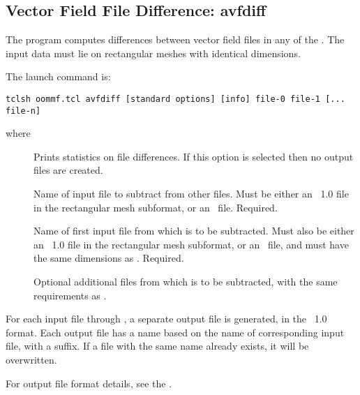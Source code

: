 
\subsection{Vector Field File Difference:
          avfdiff}\label{sec:avfdiff}%
%
The  program computes differences between vector field files
in any of the .  The input data must lie on rectangular meshes with
identical dimensions.

The  launch command is:
\begin{verbatim}
tclsh oommf.tcl avfdiff [standard options] [info] file-0 file-1 [... file-n]
\end{verbatim}
where
\begin{description}
\item[]
  Prints statistics on file differences.  If this option is selected
  then no output files are created.
\item[]
  Name of input file to subtract from other files.  Must be either
  an \OVF\ 1.0 file in the rectangular mesh subformat, or an \VIO\
  file.  Required.
\item[]
  Name of first input file from which  is to be subtracted.
  Must also be either an \OVF\ 1.0 file in the rectangular mesh
  subformat, or an \VIO\ file, and must have the same dimensions as
  \cd{file-0}.  Required.
\item[]
  Optional additional files from which  is to be
  subtracted, with the same requirements as .
\end{description}

For each input file  through , a separate output
file is generated, in the \OVF\ 1.0 format.  Each output file has a
name based on the name of corresponding input file, with a 
suffix.  If a file with the same name already exists, it will be
overwritten.

For output file format details, see the .

